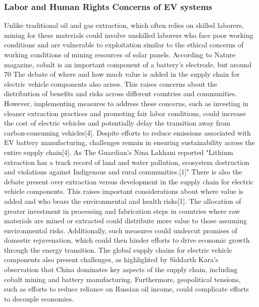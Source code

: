 \documentclass[10pt,twocolumn]{article}
\begin{document}
\subsubsection{Labor and Human Rights Concerns of EV systems } Unlike traditional oil and gas extraction, which often relies on skilled laborers, mining for these materials could involve unskilled laborers who face poor working conditions and are vulnerable to exploitation similar to the ethical concerns of working conditions of mining resources of solar panels. According to Nature magazine, cobalt is an important component of a battery’s electrode, but around 70%
The debate of where and how much value is added in the supply chain for electric vehicle components also arises. This raises concerns about the distribution of benefits and risks across different countries and communities. However, implementing measures to address these concerns, such as investing in cleaner extraction practices and promoting fair labor conditions, could increase the cost of electric vehicles and potentially delay the transition away from carbon-consuming vehicles[4]. Despite efforts to reduce emissions associated with EV battery manufacturing, challenges remain in ensuring sustainability across the entire supply chain[4]. As The Guardian's Nina Lakhani reported "Lithium extraction has a track record of land and water pollution, ecosystem destruction and violations against Indigenous and rural communities.[1]" There is also the  debate present over extraction versus development in the supply chain for electric vehicle components. This raises important considerations about where value is added and who bears the environmental and health risks[1]. The allocation of greater investment in processing and fabrication steps in countries where raw materials are mined or extracted could distribute more value to those assuming environmental risks. Additionally, such measures could undercut promises of domestic rejuvenation, which could then hinder efforts to drive economic growth through the energy transition. The global supply chains for electric vehicle components also present challenges, as highlighted by Siddarth Kara's observation that China dominates key aspects of the supply chain, including cobalt mining and battery manufacturing. Furthermore, geopolitical tensions, such as efforts to reduce reliance on Russian oil income, could complicate efforts to decouple economies. 
\end{document}
